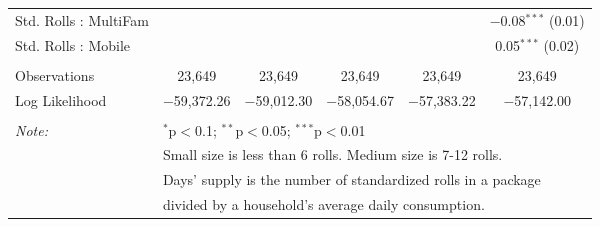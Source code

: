 \begin{table}[!htbp]
\begin{tabular}{@{\extracolsep{5pt}}lccccc}
  Std. Rolls : MultiFam &  &  &  &  & $-$0.08$^{***}$ (0.01) \\ 
  Std. Rolls : Mobile &  &  &  &  & 0.05$^{***}$ (0.02) \\ 
 \hline \\[-1.8ex] 
Observations & 23,649 & 23,649 & 23,649 & 23,649 & 23,649 \\ 
Log Likelihood & $-$59,372.26 & $-$59,012.30 & $-$58,054.67 & $-$57,383.22 & $-$57,142.00 \\ 
\hline 
\hline \\[-1.8ex] 
\textit{Note:}  & \multicolumn{5}{l}{$^{*}$p$<$0.1; $^{**}$p$<$0.05; $^{***}$p$<$0.01} \\ 
 & \multicolumn{5}{l}{Small size is less than 6 rolls. Medium size is 7-12 rolls. } \\ 
 & \multicolumn{5}{l}{Days' supply is the number of standardized rolls in a package} \\ 
 & \multicolumn{5}{l}{divided by a household's average daily consumption.} \\ 
\end{tabular} 
\end{table} 
